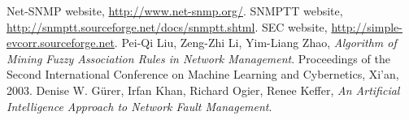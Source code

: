 \documentclass[10pt,a4paper]{article}
\begin{document}
\begin{thebibliography}{9}

Net-SNMP website, \url{http://www.net-snmp.org/}.
SNMPTT website, \url{http://snmptt.sourceforge.net/docs/snmptt.shtml}.
SEC website, \url{http://simple-evcorr.sourceforge.net}.
  Pei-Qi Liu, Zeng-Zhi Li, Yim-Liang Zhao,
  \emph{Algorithm of Mining Fuzzy Association Rules in Network Management}.
  Proceedings of the Second International Conference on Machine Learning and Cybernetics, Xi'an,
  2003.
  Denise W. Gürer, Irfan Khan, Richard Ogier, Renee Keffer,
  \emph{An Artificial Intelligence Approach to Network Fault Management}.
\end{thebibliography}
    
\end{document}
